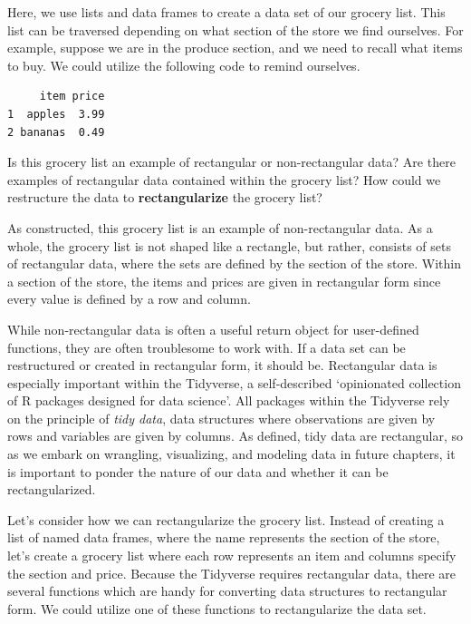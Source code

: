 \documentclass[
]{article}
\newenvironment{Shaded}{\begin{snugshade}}{\end{snugshade}}
\newcommand{\NormalTok}[1]{#1}
\newcommand{\OperatorTok}[1]{\textcolor[rgb]{0.81,0.36,0.00}{\textbf{#1}}}
\newenvironment{reflect}{
  \specialblock{reflect}{lightbulb-fill.png}{Reflect}
}{\endspecialblock}
\begin{document}
Here, we use lists and data frames to create a data set of our grocery list. This list can be traversed depending on what section of the store we find ourselves. For example, suppose we are in the produce section, and we need to recall what items to buy. We could utilize the following code to remind ourselves.

\begin{Shaded}
\end{Shaded}

\begin{verbatim}
     item price
1  apples  3.99
2 bananas  0.49
\end{verbatim}

\begin{reflect}
Is this grocery list an example of rectangular or non-rectangular data?
Are there examples of rectangular data contained within the grocery
list? How could we restructure the data to \textbf{rectangularize} the
grocery list?
\end{reflect}

As constructed, this grocery list is an example of non-rectangular data. As a whole, the grocery list is not shaped like a rectangle, but rather, consists of sets of rectangular data, where the sets are defined by the section of the store. Within a section of the store, the items and prices are given in rectangular form since every value is defined by a row and column.

While non-rectangular data is often a useful return object for user-defined functions, they are often troublesome to work with. If a data set can be restructured or created in rectangular form, it should be. Rectangular data is especially important within the Tidyverse, a self-described `opinionated collection of R packages designed for data science'. All packages within the Tidyverse rely on the principle of \emph{tidy data}, data structures where observations are given by rows and variables are given by columns. As defined, tidy data are rectangular, so as we embark on wrangling, visualizing, and modeling data in future chapters, it is important to ponder the nature of our data and whether it can be rectangularized.

Let's consider how we can rectangularize the grocery list. Instead of creating a list of named data frames, where the name represents the section of the store, let's create a grocery list where each row represents an item and columns specify the section and price. Because the Tidyverse requires rectangular data, there are several functions which are handy for converting data structures to rectangular form. We could utilize one of these functions to rectangularize the data set.
\end{document}
